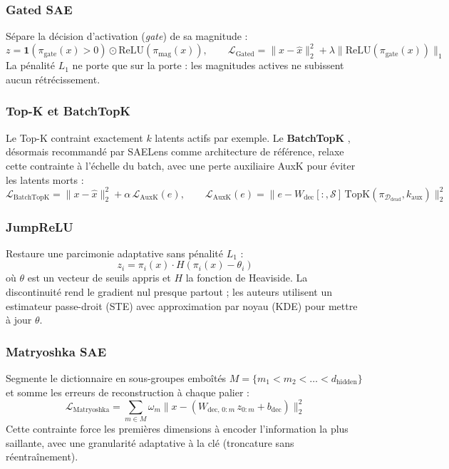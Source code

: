 \documentclass[11pt]{article}
\newcommand{\ind}{\mathbf{1}}
\begin{document}
\subsubsection{Gated SAE}
Sépare la décision d'activation (\emph{gate}) de sa magnitude
\cite{rajamanoharan2024gated} :
\[
  z = \ind(\pi_\text{gate}(x) > 0) \odot \text{ReLU}(\pi_\text{mag}(x)), \qquad
  \mathcal{L}_\text{Gated} = \|x - \hat{x}\|_2^2 + \lambda \|\text{ReLU}(\pi_\text{gate}(x))\|_1
\]
La pénalité $L_1$ ne porte que sur la porte : les magnitudes actives ne
subissent aucun rétrécissement.

\subsubsection{Top-K et BatchTopK}
Le Top-K contraint exactement $k$ latents actifs par exemple. Le
\textbf{BatchTopK} \cite{gao2024topk, bussmann2025batchtopk}, désormais
recommandé par SAELens comme architecture de référence, relaxe cette
contrainte à l'échelle du batch, avec une perte auxiliaire AuxK pour éviter
les latents morts :
\[
  \mathcal{L}_\text{BatchTopK} = \|x - \hat{x}\|_2^2 + \alpha\,\mathcal{L}_\text{AuxK}(e), \qquad
  \mathcal{L}_\text{AuxK}(e) = \bigl\|e - W_\text{dec}[:,\mathcal{S}]\,\text{TopK}(\pi_{\mathcal{D}_\text{dead}}, k_\text{aux})\bigr\|_2^2
\]

\subsubsection{JumpReLU}
Restaure une parcimonie adaptative sans pénalité $L_1$
\cite{rajamanoharan2024jumprelu} :
\[
  z_i = \pi_i(x) \cdot H(\pi_i(x) - \theta_i)
\]
où $\theta$ est un vecteur de seuils appris et $H$ la fonction de Heaviside.
La discontinuité rend le gradient nul presque partout ; les auteurs
utilisent un estimateur passe-droit (STE) avec approximation par noyau (KDE)
pour mettre à jour $\theta$.

\subsubsection{Matryoshka SAE}
Segmente le dictionnaire en sous-groupes emboîtés
$M = \{m_1 < m_2 < \dots < d_\text{hidden}\}$ et somme les erreurs de
reconstruction à chaque palier \cite{bussmann2025matryoshka} :
\[
  \mathcal{L}_\text{Matryoshka} = \sum_{m \in M} \omega_m \bigl\|x - (W_{\text{dec},\,0:m}\,z_{0:m} + b_\text{dec})\bigr\|_2^2
\]
Cette contrainte force les premières dimensions à encoder l'information la
plus saillante, avec une granularité adaptative à la clé (troncature sans
réentraînement).
\end{document}
